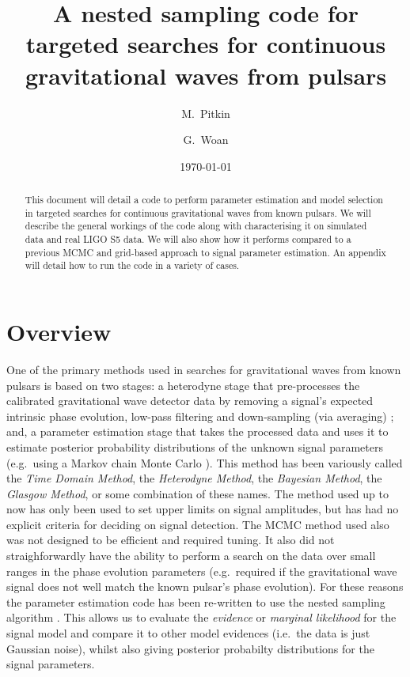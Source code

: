 \documentclass[aps,prd,showpacs,superscriptaddress,twocolumn,preprintnumbers,altaffilletter]{revtex4-1}
\newcommand{\gws}{gravitational waves\xspace}
\newcommand{\gw}{gravitational wave\xspace}
\begin{document}
\title{A nested sampling code for targeted searches for continuous \gws from pulsars}

\author{M.~Pitkin}
\author{G.~Woan}


\date{\today}

\begin{abstract}
This document will detail a code to perform parameter estimation and model selection in targeted searches for
continuous \gws from known pulsars. We will describe the general workings of the code along with characterising
it on simulated data and real LIGO S5 data. We will also show how it performs compared to a previous MCMC and
grid-based approach to signal parameter estimation. An appendix will detail how to run the code in a variety of cases.
\end{abstract}

\preprint{}

\maketitle

\section{Overview}

One of the primary methods used in searches for \gws from known pulsars is based on two stages: a
heterodyne stage that pre-processes the calibrated \gw detector data by removing a signal's expected
intrinsic phase evolution, low-pass filtering and down-sampling (via averaging) \cite{2005PhRvD..72j2002D};
and, a parameter estimation stage that takes the processed data and uses it to estimate posterior
probability distributions of the unknown signal parameters (e.g.\ using a Markov chain Monte Carlo
\cite{2010ApJ...713..671A}). This method has been variously called the {\it Time Domain Method},
the {\it Heterodyne Method}, the {\it Bayesian Method}, the {\it Glasgow Method}, or some combination
of these names. The method used up to now has only been used to set upper limits on signal amplitudes,
but has had no explicit criteria for deciding on signal detection. The MCMC method used also was not
designed to be efficient and required tuning. It also did not straighforwardly have the ability to
perform a search on the data over small ranges in the phase evolution parameters (e.g.\ required if
the \gw signal does not well match the known pulsar's phase evolution). For these reasons the parameter
estimation code has been re-written to use the nested sampling algorithm \cite{Skilling:2006}. This allows us to
evaluate the {\it evidence} or {\it marginal likelihood} for the signal model and compare it to other
model evidences (i.e.\ the data is just Gaussian noise), whilst also giving posterior probabilty
distributions for the signal parameters.
\end{document}
